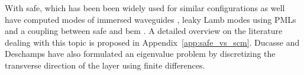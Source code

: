With \acrfull{safe}, which has been been widely used for similar configurations as well have computed modes of immersed waveguides \cite{zuo2017}, leaky Lamb modes using PMLs and a coupling between \acrshort{safe} and \acrshort{bem} \cite{mazzotti2013}. A detailed overview on the literature dealing with this topic is proposed in Appendix~\ref{app:safe_vs_scm}. Ducasse and Deschamps \cite{ducasse2022} have also formulated an eigenvalue problem by discretizing the transverse direction of the layer using finite differences.


